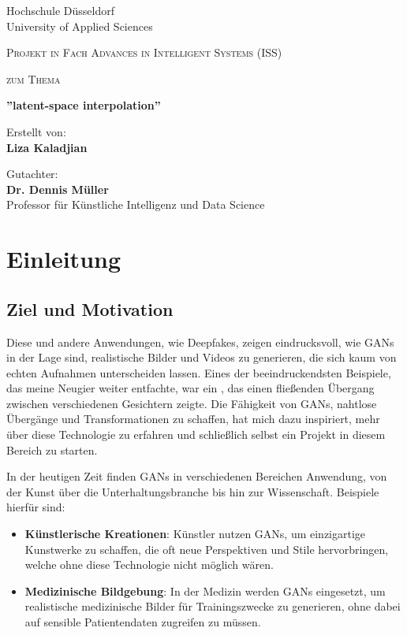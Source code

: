 \documentclass[a4paper, 12pt]{article}
\title{\haThema}
\author{\haAutor}
\date{\today}
\newcommand{\haThema}{”latent-space interpolation”}
\newcommand{\haAutor}{Liza Kaladjian}
\newcommand{\haDeckblattTextEins}{Projekt in Fach Advances in Intelligent Systems (ISS)}
\newcommand{\haGutachter}{Dr. Dennis Müller}
\newcommand{\haGutachterText}{Professor für Künstliche Intelligenz und Data Science}
\begin{document}
\begin{titlepage}
Hochschule Düsseldorf \\
University of Applied Sciences	
\begin{center}
\vspace{1.5cm}
{\scshape\large \haDeckblattTextEins \par}
\vspace{1cm}
{\scshape\large zum Thema\par}
\vspace{1.5cm}
{\LARGE\bfseries \haThema \par}
\vfill
{Erstellt von:\\ {\bfseries \haAutor} \par}
\vspace{1cm}
\vspace{1cm}
Gutachter:\\ {\bfseries \haGutachter}\\ \haGutachterText
\vfill
\end{center}
\end{titlepage}
\thispagestyle{empty}
\newpage

\tableofcontents
\thispagestyle{empty}
\newpage

\setcounter{page}{1}

\section{Einleitung}
\subsection{Ziel und Motivation}


Diese und andere Anwendungen, wie Deepfakes, zeigen eindrucksvoll, wie GANs in der Lage sind, realistische Bilder und Videos zu generieren, die sich kaum von echten Aufnahmen unterscheiden lassen. Eines der beeindruckendsten Beispiele, das meine Neugier weiter entfachte, war ein \cite{gif_example}, das einen fließenden Übergang zwischen verschiedenen Gesichtern zeigte. Die Fähigkeit von GANs, nahtlose Übergänge und Transformationen zu schaffen, hat mich dazu inspiriert, mehr über diese Technologie zu erfahren und schließlich selbst ein Projekt in diesem Bereich zu starten.

In der heutigen Zeit finden GANs in verschiedenen Bereichen Anwendung, von der Kunst über die Unterhaltungsbranche bis hin zur Wissenschaft. Beispiele hierfür sind:
\begin{itemize}
  \item \textbf{Künstlerische Kreationen}: Künstler nutzen GANs, um einzigartige Kunstwerke zu schaffen, die oft neue Perspektiven und Stile hervorbringen, welche ohne diese Technologie nicht möglich wären.\cite{kunstloft_article}
  \item \textbf{Medizinische Bildgebung}: In der Medizin werden GANs eingesetzt, um realistische medizinische Bilder für Trainingszwecke zu generieren, ohne dabei auf sensible Patientendaten zugreifen zu müssen. \cite{avinci_ai_gans}
\end{itemize}
\end{document}
